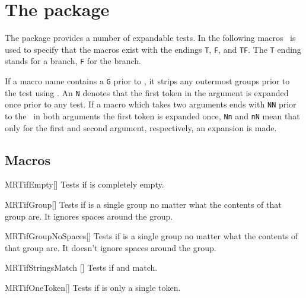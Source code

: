 \chapter{The  package}
The  package provides a number of expandable tests. In the following
macros \tfarg\ is used to specify that the macros exist with the endings
\texttt{T}, \texttt{F}, and \texttt{TF}. The \texttt{T} ending stands for a
 branch, \texttt{F} for the  branch.

If a macro name contains a \texttt{G} prior to \tfarg, it strips any outermost
groups prior to the test using . An \texttt{N} denotes that the
first token in the argument is expanded once prior to any test. If a macro which
takes two arguments ends with \texttt{NN} prior to the \tfarg\ in both arguments
the first token is expanded once, \texttt{Nn} and \texttt{nN} mean that only for
the first and second argument, respectively, an expansion is made.

\section{Macros}
\begin{describemacroTF}[G,N,GN]{MRTifEmpty}[]
  Tests if  is completely empty.
\end{describemacroTF}

\begin{describemacroTF}[N]{MRTifGroup}[]
  Tests if  is a single group no matter what the contents of that
  group are. It ignores spaces around the group.
\end{describemacroTF}

\begin{describemacroTF}[N]{MRTifGroupNoSpaces}[]
  Tests if  is a single group no matter what the contents of that
  group are. It doesn't ignore spaces around the group.
\end{describemacroTF}

\begin{describemacroTF}{MRTifStringsMatch}%
  []
  Tests if  and  match.
\end{describemacroTF}

\begin{describemacroTF}[G,N,GN]{MRTifOneToken}[]
  Tests if  is only a single token.
\end{describemacroTF}

